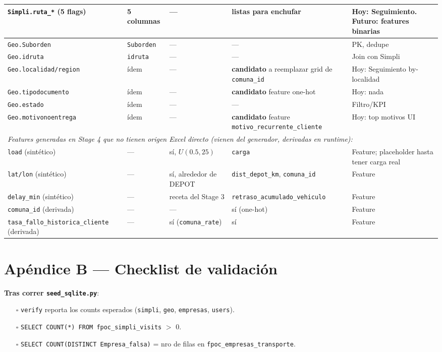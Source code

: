 \documentclass[11pt,a4paper]{article}
\begin{document}
\begin{landscape}
\begin{longtable}{p{4cm} p{3cm} p{3.5cm} p{4cm} p{4.5cm}}
\texttt{Simpli.ruta\_*} (5 flags) & 5 columnas & --- & \textbf{listas para enchufar} & Hoy: Seguimiento. Futuro: features binarias \\
\midrule
\texttt{Geo.Suborden} & \texttt{Suborden} & --- & --- & PK, dedupe \\
\texttt{Geo.idruta} & \texttt{idruta} & --- & --- & Join con Simpli \\
\texttt{Geo.localidad/region} & ídem & --- & \textbf{candidato} a reemplazar grid de \texttt{comuna\_id} & Hoy: Seguimiento by-localidad \\
\texttt{Geo.tipodocumento} & ídem & --- & \textbf{candidato} feature one-hot & Hoy: nada \\
\texttt{Geo.estado} & ídem & --- & --- & Filtro/KPI \\
\texttt{Geo.motivonoentrega} & ídem & --- & \textbf{candidato} feature \texttt{motivo\_recurrente\_cliente} & Hoy: top motivos UI \\
\midrule
\multicolumn{5}{l}{\textit{Features generadas en Stage 4 que no tienen origen Excel directo (vienen del generador, derivadas en runtime):}} \\
\texttt{load} (sintético) & --- & sí, $U(0.5, 25)$ & \texttt{carga} & Feature; placeholder hasta tener carga real \\
\texttt{lat/lon} (sintético) & --- & sí, alrededor de DEPOT & \texttt{dist\_depot\_km}, \texttt{comuna\_id} & Feature \\
\texttt{delay\_min} (sintético) & --- & receta del Stage 3 & \texttt{retraso\_acumulado\_vehiculo} & Feature \\
\texttt{comuna\_id} (derivada) & --- & --- & sí (one-hot) & Feature \\
\texttt{tasa\_fallo\_historica\_cliente} (derivada) & --- & sí (\texttt{comuna\_rate}) & sí & Feature \\
\bottomrule
\end{longtable}
\end{landscape}

\section{Apéndice B --- Checklist de validación}

\textbf{Tras correr \texttt{seed\_sqlite.py}}:
\begin{itemize}[leftmargin=2em]
  \item[$\square$] \texttt{verify} reporta los counts esperados (\texttt{simpli}, \texttt{geo}, \texttt{empresas}, \texttt{users}).
  \item[$\square$] \texttt{SELECT COUNT(*) FROM fpoc\_simpli\_visits} $>$ 0.
  \item[$\square$] \texttt{SELECT COUNT(DISTINCT Empresa\_falsa)} = nro de filas en \texttt{fpoc\_empresas\_transporte}.
\end{itemize}
\end{document}
